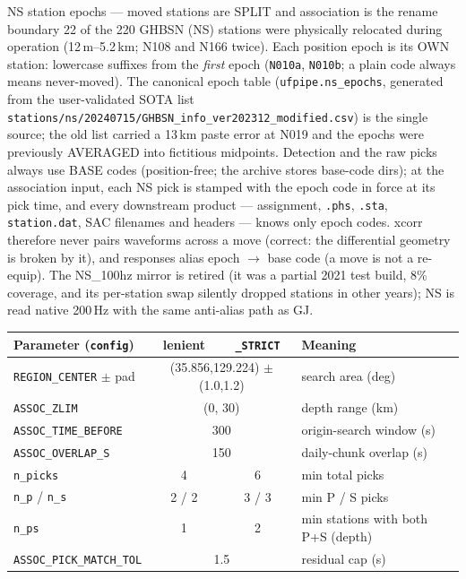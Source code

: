 \documentclass[11pt]{article}
\newcommand{\code}[1]{\texttt{#1}}
\begin{document}
\begin{warnbox}{NS station epochs --- moved stations are SPLIT and association is the rename boundary}
22 of the 220 GHBSN (NS) stations were physically relocated during operation (12\,m--5.2\,km; N108 and N166
twice). Each position epoch is its OWN station: lowercase suffixes from the \emph{first} epoch
(\code{N010a}, \code{N010b}; a plain code always means never-moved). The canonical epoch table
(\code{ufpipe.ns\_epochs}, generated from the user-validated SOTA list
\code{stations/ns/20240715/GHBSN\_info\_ver202312\_modified.csv}) is the single source; the old list carried a
13\,km paste error at N019 and the epochs were previously AVERAGED into fictitious midpoints. Detection and the
raw picks always use BASE codes (position-free; the archive stores base-code dirs); at the association input,
each NS pick is stamped with the epoch code in force at its pick time, and every downstream product ---
assignment, \code{.phs}, \code{.sta}, \code{station.dat}, SAC filenames and headers --- knows only epoch codes.
xcorr therefore never pairs waveforms across a move (correct: the differential geometry is broken by it), and
responses alias epoch $\rightarrow$ base code (a move is not a re-equip). The NS\_100hz mirror is retired (it
was a partial 2021 test build, 8\% coverage, and its per-station swap silently dropped stations in other
years); NS is read native 200\,Hz with the same anti-alias path as GJ.
\end{warnbox}
\begin{center}
\small
\begin{tabular}{@{}lcc l@{}}
\toprule
Parameter (\code{config}) & lenient & \code{\_STRICT} & Meaning \\
\midrule
\code{REGION\_CENTER} $\pm$ pad & \multicolumn{2}{c}{(35.856,129.224) $\pm$ (1.0,1.2)} & search area (deg) \\
\code{ASSOC\_ZLIM} & \multicolumn{2}{c}{(0, 30)} & depth range (km) \\
\code{ASSOC\_TIME\_BEFORE} & \multicolumn{2}{c}{300} & origin-search window (s) \\
\code{ASSOC\_OVERLAP\_S} & \multicolumn{2}{c}{150} & daily-chunk overlap (s) \\
\code{n\_picks} & 4 & 6 & min total picks \\
\code{n\_p} / \code{n\_s} & 2 / 2 & 3 / 3 & min P / S picks \\
\code{n\_ps} & 1 & 2 & min stations with both P+S (depth) \\
\code{ASSOC\_PICK\_MATCH\_TOL} & \multicolumn{2}{c}{1.5} & residual cap (s) \\
\bottomrule
\end{tabular}
\end{center}
\end{document}
